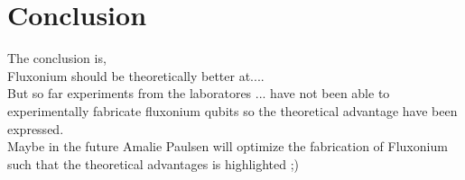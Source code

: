 \chapter{Conclusion}\label{chap:conclusion}

The conclusion is, 
\\
Fluxonium should be theoretically better at.... 
\\
But so far experiments from the laboratores ... have not been able to experimentally fabricate fluxonium qubits so the theoretical advantage have been expressed. 
\\
Maybe in the future Amalie Paulsen will optimize the fabrication of Fluxonium such that the theoretical advantages is highlighted ;)
